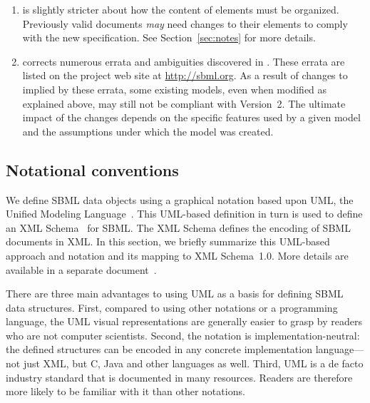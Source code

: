 \begin{enumerate}
\item \sbmltwotwo is slightly stricter about how the content of
   elements must be organized.  Previously valid
  \sbmltwoone documents \emph{may} need changes to their
   elements to comply with the new specification.  See
  Section~\ref{sec:notes} for more details. 
  
\item \sbmltwotwo corrects numerous errata and ambiguities
  discovered in \sbmltwoone.  These errata are listed on the
  project web site at \url{http://sbml.org}.  As a result of
  changes to \sbmltwo implied by these errata, some existing
  \sbmltwoone models, even when modified as explained above, may
  still not be compliant with Version~2.  The ultimate impact of
  the changes depends on the specific features used by a given
  model and the assumptions under which the model was created.


\end{enumerate}


\subsection{Notational conventions}
\label{sec:notation}

We define SBML data objects using a graphical notation based upon
UML, the Unified Modeling
Language~\citep{eriksson:1998,oestereich:1999}.  This UML-based
definition in turn is used to define an XML
Schema~\citep{biron:2000,fallside:2000,thompson:2000} for SBML.
The XML Schema defines the encoding of SBML documents in XML.  In
this section, we briefly summarize this UML-based approach and
notation and its mapping to XML Schema~1.0.  More details are
available in a separate document~\citep{hucka:2000b}.

There are three main advantages to using UML as a basis for
defining SBML data structures.  First, compared to using other
notations or a programming language, the UML visual
representations are generally easier to grasp by readers who are
not computer scientists.  Second, the notation is
implementation-neutral: the defined structures can be encoded in
any concrete implementation language---not just XML, but C, Java
and other languages as well.  Third, UML is a de facto industry
standard that is documented in many resources.  Readers are
therefore more likely to be familiar with it than other notations.


